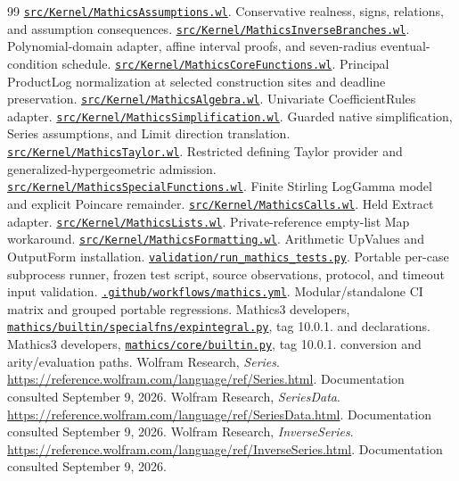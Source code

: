 \documentclass[11pt,a4paper]{article}
\newcommand{\code}[1]{\texttt{\detokenize{#1}}}
\newcommand{\repoentry}[2]{\href{https://github.com/VladimirReshetnikov/Asymptotic/blob/513917b5b387152256b14ac76d92dd30cd13a11d/#1}{\nolinkurl{#1}}. #2}
\theoremstyle{remark}
\begin{document}
\begin{thebibliography}{99}
\repoentry{src/Kernel/MathicsAssumptions.wl}{Conservative realness, signs, relations, and assumption consequences.}
\repoentry{src/Kernel/MathicsInverseBranches.wl}{Polynomial-domain adapter, affine interval proofs, and seven-radius eventual-condition schedule.}
\repoentry{src/Kernel/MathicsCoreFunctions.wl}{Principal ProductLog normalization at selected construction sites and deadline preservation.}
\repoentry{src/Kernel/MathicsAlgebra.wl}{Univariate CoefficientRules adapter.}
\repoentry{src/Kernel/MathicsSimplification.wl}{Guarded native simplification, Series assumptions, and Limit direction translation.}
\repoentry{src/Kernel/MathicsTaylor.wl}{Restricted defining Taylor provider and generalized-hypergeometric admission.}
\repoentry{src/Kernel/MathicsSpecialFunctions.wl}{Finite Stirling LogGamma model and explicit Poincare remainder.}
\repoentry{src/Kernel/MathicsCalls.wl}{Held Extract adapter.}
\repoentry{src/Kernel/MathicsLists.wl}{Private-reference empty-list Map workaround.}
\repoentry{src/Kernel/MathicsFormatting.wl}{Arithmetic UpValues and OutputForm installation.}
\repoentry{validation/run_mathics_tests.py}{Portable per-case subprocess runner, frozen test script, source observations, protocol, and timeout input validation.}
\repoentry{.github/workflows/mathics.yml}{Modular/standalone CI matrix and grouped portable regressions.}
 Mathics3 developers, \href{https://github.com/Mathics3/mathics-core/blob/10.0.1/mathics/builtin/specialfns/expintegral.py}{\nolinkurl{mathics/builtin/specialfns/expintegral.py}}, tag 10.0.1. \code{ProductLog} and \code{LambertW} declarations.
 Mathics3 developers, \href{https://github.com/Mathics3/mathics-core/blob/10.0.1/mathics/core/builtin.py}{\nolinkurl{mathics/core/builtin.py}}, tag 10.0.1. \code{SympyFunction} conversion and \code{MPMathFunction} arity/evaluation paths.
 Wolfram Research, \emph{Series}. \url{https://reference.wolfram.com/language/ref/Series.html}. Documentation consulted September 9, 2026.
 Wolfram Research, \emph{SeriesData}. \url{https://reference.wolfram.com/language/ref/SeriesData.html}. Documentation consulted September 9, 2026.
 Wolfram Research, \emph{InverseSeries}. \url{https://reference.wolfram.com/language/ref/InverseSeries.html}. Documentation consulted September 9, 2026.

\end{thebibliography}
\end{document}
